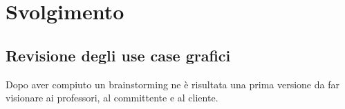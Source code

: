 \section{Svolgimento}

\subsection{Revisione degli use case grafici}

Dopo aver compiuto un brainstorming ne è risultata una prima versione da far visionare ai professori, al committente e al cliente.
